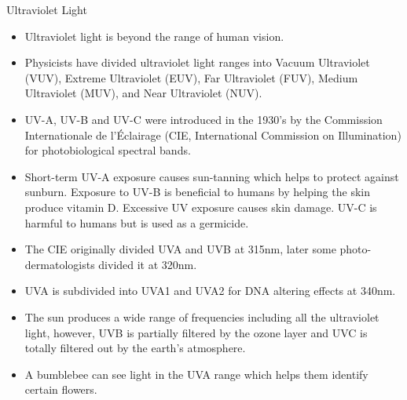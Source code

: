 {\Large Ultraviolet Light}
\begin{itemize}
\item Ultraviolet light is beyond the range of human vision.

\item Physicists have divided ultraviolet light ranges into Vacuum Ultraviolet (VUV), Extreme Ultraviolet (EUV), Far Ultraviolet (FUV), Medium Ultraviolet (MUV), and Near Ultraviolet (NUV).

\item UV-A, UV-B and UV-C were introduced in the 1930's by the Commission Internationale de l'\'{E}clairage (CIE, International Commission on Illumination) for photobiological spectral bands.

\item Short-term UV-A exposure causes sun-tanning which helps to protect against sunburn. Exposure to UV-B is beneficial to humans by helping the skin produce vitamin D. Excessive UV exposure causes skin damage. UV-C is harmful to humans but is used as a germicide.

\item The CIE originally divided UVA and UVB at 315nm, later some photo-dermatologists divided it at 320nm.

\item UVA is subdivided into UVA1 and UVA2 for DNA altering effects at 340nm.

\item The sun produces a wide range of frequencies including all the ultraviolet light, however, UVB is partially filtered by the ozone layer and UVC is totally filtered out by the earth's atmosphere.

\item A bumblebee can see light in the UVA range which helps them identify certain flowers.
\end{itemize}






